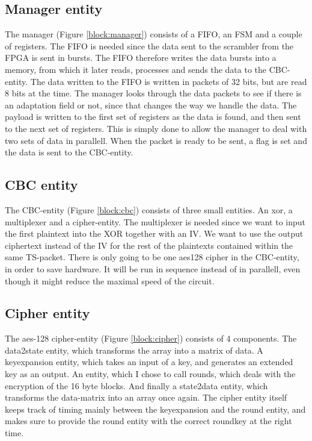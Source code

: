 \subsection{Manager entity}
The manager (Figure \ref{block:manager}) consists of a FIFO, an FSM and a couple 
of registers. The FIFO is needed since the data sent to the scrambler from the 
FPGA is sent in bursts. The FIFO therefore writes the data bursts into a memory, 
from which it later reads, processes and sends the data to the CBC-entity. The 
data written to the FIFO is written in packets of 32 bits, but are read 8 bits 
at the time. The manager looks through the data packets to see if there is an 
adaptation field or not, since that changes the way we handle the data. The 
payload is written to the first set of registers as the data is found, and then 
sent to the next set of registers. This is simply done to allow the manager to 
deal with two sets of data in parallell. When the packet is ready to be sent, a 
flag is set and the data is sent to the CBC-entity. 

\subsection{CBC entity}
The CBC-entity (Figure \ref{block:cbc}) consists of three small entities. An 
xor, a multiplexer and a cipher-entity. The multiplexer is needed since we want 
to input the first plaintext into the XOR together with an IV. We want to use 
the output ciphertext instead of the IV for the rest of the plaintexts contained 
within the same TS-packet. There is only going to be one aes128 cipher in the 
CBC-entity, in order to save hardware. It will be run in sequence instead of in 
parallell, even though it might reduce the maximal speed of the circuit.

\subsection{Cipher entity}
The aes-128 cipher-entity (Figure \ref{block:cipher}) consists of 4 components. 
The data2state entity, which transforms the array into a matrix of data. A 
keyexpansion entity, which takes an input of a key, and generates an extended 
key as an output. An entity, which I chose to call rounds, which deals with the 
encryption of the 16 byte blocks. And finally a state2data entity, which 
transforms the data-matrix into an array once again. The cipher entity itself 
keeps track of timing mainly between the keyexpansion and the round entity, and 
makes sure to provide the round entity with the correct roundkey at the right 
time.

